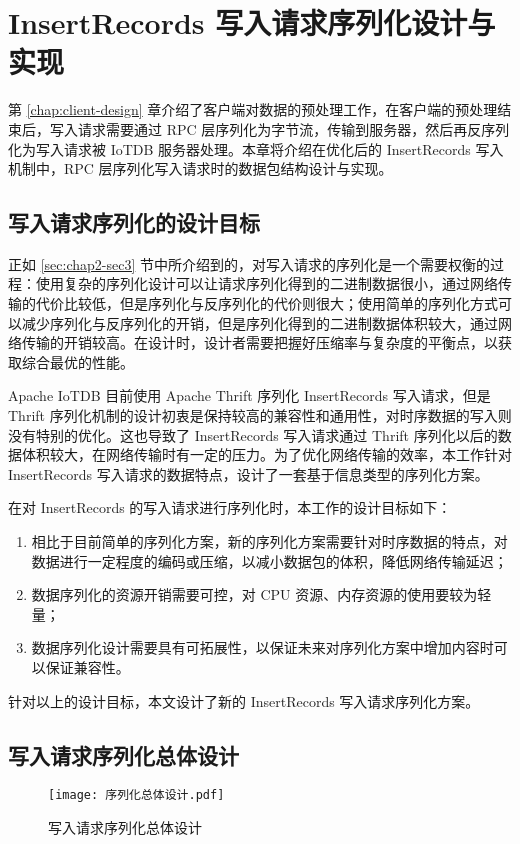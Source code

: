 
\chapter{InsertRecords 写入请求序列化设计与实现\label{sec:chap6}}
第 \ref{chap:client-design} 章介绍了客户端对数据的预处理工作，在客户端的预处理结束后，写入请求需要通过 RPC 层序列化为字节流，传输到服务器，然后再反序列化为写入请求被 IoTDB 服务器处理。本章将介绍在优化后的 InsertRecords 写入机制中，RPC 层序列化写入请求时的数据包结构设计与实现。

\section{写入请求序列化的设计目标}
正如 \ref{sec:chap2-sec3} 节中所介绍到的，对写入请求的序列化是一个需要权衡的过程：使用复杂的序列化设计可以让请求序列化得到的二进制数据很小，通过网络传输的代价比较低，但是序列化与反序列化的代价则很大；使用简单的序列化方式可以减少序列化与反序列化的开销，但是序列化得到的二进制数据体积较大，通过网络传输的开销较高。在设计时，设计者需要把握好压缩率与复杂度的平衡点，以获取综合最优的性能。

Apache IoTDB 目前使用 Apache Thrift 序列化 InsertRecords 写入请求，但是 Thrift 序列化机制的设计初衷是保持较高的兼容性和通用性，对时序数据的写入则没有特别的优化。这也导致了 InsertRecords 写入请求通过 Thrift 序列化以后的数据体积较大，在网络传输时有一定的压力。为了优化网络传输的效率，本工作针对 InsertRecords 写入请求的数据特点，设计了一套基于信息类型的序列化方案。

在对 InsertRecords 的写入请求进行序列化时，本工作的设计目标如下：
\begin{enumerate}
  \item 相比于目前简单的序列化方案，新的序列化方案需要针对时序数据的特点，对数据进行一定程度的编码或压缩，以减小数据包的体积，降低网络传输延迟；
  \item 数据序列化的资源开销需要可控，对 CPU 资源、内存资源的使用要较为轻量；
  \item 数据序列化设计需要具有可拓展性，以保证未来对序列化方案中增加内容时可以保证兼容性。
\end{enumerate}
针对以上的设计目标，本文设计了新的 InsertRecords 写入请求序列化方案。

\section{写入请求序列化总体设计}
\begin{figure}
  \centering
  \texttt{[image: 序列化总体设计.pdf]}
  \caption{写入请求序列化总体设计}
  \label{fig:rpc-general-design}
\end{figure}

